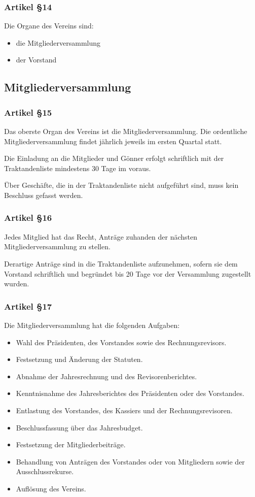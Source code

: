 \documentclass[a4paper,10pt,fleqn]{article}
\begin{document}
\subsubsection*{Artikel §14}
Die Organe des Vereins sind:
\begin{itemize}
\item die Mitgliederversammlung
\item der Vorstand
\end{itemize}

\subsection{Mitgliederversammlung}

\subsubsection*{Artikel §15}
Das oberste Organ des Vereins ist die Mitgliederversammlung.
 Die ordentliche Mitgliederversammlung findet jährlich
jeweils im ersten Quartal statt.

Die Einladung an die Mitglieder und Gönner erfolgt 
schriftlich mit der Traktandenliste mindestens 30 Tage im
voraus.

Über Geschäfte, die in der Traktandenliste nicht aufgeführt 
sind, muss kein Beschluss gefasst werden.

\subsubsection*{Artikel §16}
Jedes Mitglied hat das Recht, Anträge zuhanden der nächsten 
Mitgliederversammlung zu stellen.

Derartige Anträge sind in die Traktandenliste aufzunehmen, 
sofern sie dem Vorstand schriftlich und begründet bis 20
Tage vor der Versammlung zugestellt wurden.

\newpage
\subsubsection*{Artikel §17}
Die Mitgliederversammlung hat die folgenden Aufgaben:
\begin{itemize}
\item Wahl des Präsidenten, des Vorstandes sowie des 
Rechnungsrevisors.
\item Festsetzung und Änderung der Statuten.
\item Abnahme der Jahresrechnung und des Revisorenberichtes.
\item Kenntnisnahme des Jahresberichtes des Präsidenten 
oder des Vorstandes.
\item Entlastung des Vorstandes, des Kassiers und der 
Rechnungsrevisoren.
\item Beschlussfassung über das Jahresbudget.
\item Festsetzung der Mitgliederbeiträge.
\item Behandlung von Anträgen des Vorstandes oder von 
Mitgliedern sowie der Ausschlussrekurse.
\item Auflösung des Vereins.
\end{itemize}
\end{document}
